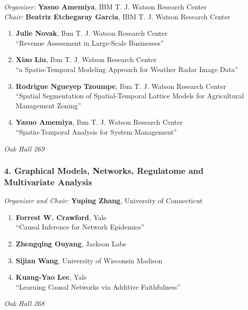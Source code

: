 \emph{Organizer:} \textbf{Yasuo Amemiya}, IBM T. J. Watson Research Center \\
\emph{Chair:} \textbf{Beatriz Etchegaray Garcia}, IBM T. J. Watson Research Center

\begin{enumerate}
\item \textbf{Julie Novak}, Ibm T. J. Watson Research Center \\
``Revenue Assessment in Large-Scale Businesses''
\item \textbf{Xiao Liu}, Ibm T. J. Watson Research Center \\
``a Spatio-Temporal Modeling Approach for Weather Radar Image Data''
\item \textbf{Rodrigue Ngueyep Tzoumpe}, Ibm T. J. Watson Research Center  \\
``Spatial Segmentation of Spatial-Temporal Lattice Models for Agricultural Management Zoning''
\item \textbf{Yasuo Amemiya}, Ibm T. J. Watson Research Center \\
``Spatio-Temporal Analysis for System Management''
\end{enumerate}

\emph{Oak Hall 269} \\[.5em]

\subsubsection*{4. Graphical Models, Networks, Regulatome and Multivariate Analysis}

\emph{Organizer and Chair:} \textbf{Yuping Zhang}, University of Connecticut

\begin{enumerate}
\item \textbf{Forrest W. Crawford}, Yale \\
``Causal Inference for Network Epidemics''
\item \textbf{Zhengqing Ouyang}, Jackson Labs 
\item \textbf{Sijian Wang}, University of Wisconsin Madison 
\item \textbf{Kuang-Yao Lee}, Yale \\
``Learning Causal Networks via Additive Faithfulness''
\end{enumerate}

\emph{Oak Hall 268} \\[.5em]

